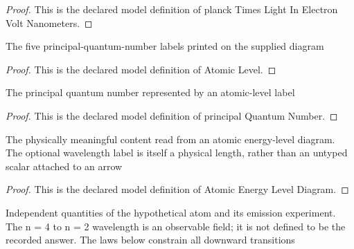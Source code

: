 \begin{proof}
  This is the declared model definition of planck Times Light In Electron Volt Nanometers.
\end{proof}
\begin{definition}
  \label{def:physics:phyx-mini-0519:phyxminiproblems-problemphyxmini0519-atomiclevel}
  The five principal-quantum-number labels printed on the supplied diagram
\end{definition}
\begin{proof}
  This is the declared model definition of Atomic Level.
\end{proof}
\begin{definition}
  \label{def:physics:phyx-mini-0519:phyxminiproblems-problemphyxmini0519-atomiclevel-principalquantumnumber}
  The principal quantum number represented by an atomic-level label
\end{definition}
\begin{proof}
  This is the declared model definition of principal Quantum Number.
\end{proof}
\begin{definition}
  \label{def:physics:phyx-mini-0519:phyxminiproblems-problemphyxmini0519-atomicenergyleveldiagram}
  The physically meaningful content read from an atomic energy-level diagram. The optional wavelength label is itself a physical length, rather than an untyped scalar attached to an arrow
\end{definition}
\begin{proof}
  This is the declared model definition of Atomic Energy Level Diagram.
\end{proof}
\begin{definition}
  \label{def:physics:phyx-mini-0519:phyxminiproblems-problemphyxmini0519-oneelectronatomexperiment}
  Independent quantities of the hypothetical atom and its emission experiment. The n = 4 to n = 2 wavelength is an observable field; it is not defined to be the recorded answer. The laws below constrain all downward transitions
\end{definition}
